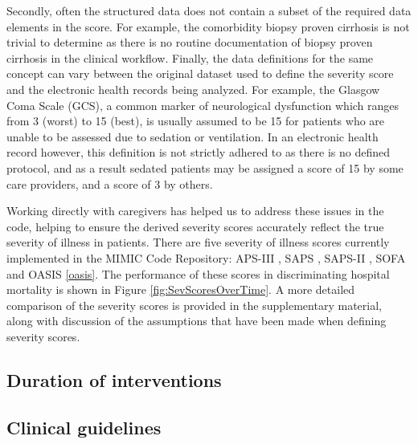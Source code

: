 \documentclass{elsart}
\begin{document}
Secondly, often the structured data does not contain a subset of the required data elements in the score. For example, the comorbidity biopsy proven cirrhosis is not trivial to determine as there is no routine documentation of biopsy proven cirrhosis in the clinical workflow. Finally, the data definitions for the same concept can vary between the original dataset used to define the severity score and the electronic health records being analyzed. For example, the Glasgow Coma Scale (GCS), a common marker of neurological dysfunction which ranges from 3 (worst) to 15 (best), is usually assumed to be 15 for patients who are unable to be assessed due to sedation or ventilation. In an electronic health record however, this definition is not strictly adhered to as there is no defined protocol, and as a result sedated patients may be assigned a score of 15 by some care providers, and a score of 3 by others.

Working directly with caregivers has helped us to address these issues in the code, helping to ensure the derived severity scores accurately reflect the true severity of illness in patients. There are five severity of illness scores currently implemented in the MIMIC Code Repository: APS-III \cite{aps}, SAPS \cite{saps}, SAPS-II \cite{sapsii}, SOFA \cite{sofa} and OASIS \ref{oasis}. The performance of these scores in discriminating hospital mortality is shown in Figure \ref{fig:SevScoresOverTime}. A more detailed comparison of the severity scores is provided in the supplementary material, along with discussion of the assumptions that have been made when defining severity scores.

\subsection{Duration of interventions}




\subsection{Clinical guidelines}




\end{document}
